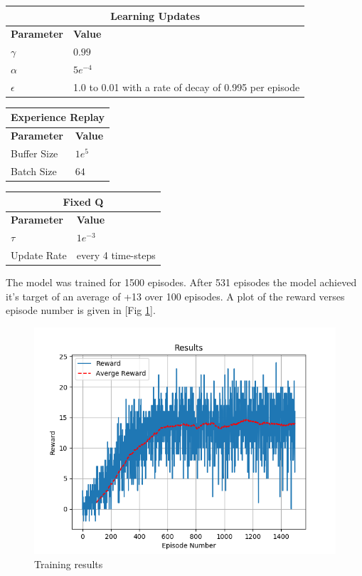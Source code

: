 \documentclass[12pt]{article}
\begin{document}
\begin{table}[h!]
\begin{center}
\begin{tabular}{|l|l|}
	\hline
	\multicolumn{2}{|c|}{\textbf{Learning Updates}}\\
	\hline
	\textbf{Parameter} & \textbf{Value}\\
	\hline
	$\gamma$ & $0.99$\\
	$\alpha$ & $5e^{-4}$\\
	$\epsilon$ & 1.0 to 0.01 with a rate of decay of 0.995 per episode\\
	\hline
\end{tabular}
\end{center}
\end{table}

\begin{table}[h!]
\begin{minipage}{.5\linewidth}
\begin{tabular}{|l|l|}
	\hline
	\multicolumn{2}{|c|}{\textbf{Experience Replay}}\\
	\hline
	\textbf{Parameter} & \textbf{Value}\\
	\hline
	Buffer Size & $1e^{5}$\\
	Batch Size & $64$\\
	\hline
\end{tabular}
\end{minipage}
\begin{minipage}{.5\linewidth}
\begin{tabular}{|l|l|}
	\hline
	\multicolumn{2}{|c|}{\textbf{Fixed Q}}\\
	\hline
	\textbf{Parameter} & \textbf{Value}\\
	\hline
		$\tau$ & $1e^{-3}$\\
		Update Rate & every 4 time-steps \\
	\hline
\end{tabular}
\end{minipage}
\end{table}

The model was trained for 1500 episodes. 
After 531 episodes the model achieved it's target of an average of +13 over 100 episodes.
A plot of the reward verses episode number is given in [Fig \ref{results}].

\begin{figure}
	\centering
	\includegraphics[width=0.8\linewidth]{./img/Results.png}
	\caption{Training results}
	\label{results}
\end{figure}
\end{document}
